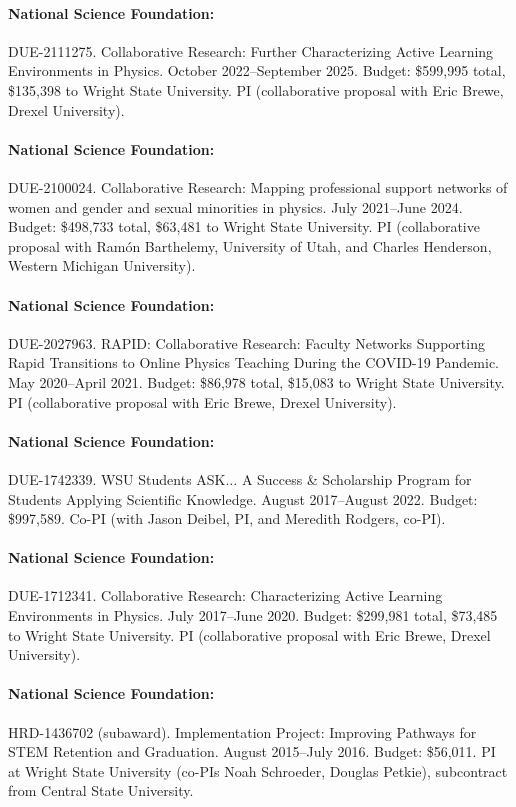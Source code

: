 \documentclass[a4paper,10pt]{article}
\begin{document}
\paragraph{National Science Foundation:} DUE-2111275. Collaborative Research: Further Characterizing Active Learning Environments in Physics. October 2022--September 2025. Budget: \$599,995
 total, \$135,398 to Wright State University. PI (collaborative proposal with Eric Brewe, Drexel University).

\paragraph{National Science Foundation:} DUE-2100024. Collaborative Research: Mapping professional support networks of women and gender and sexual minorities in physics. July 2021--June 2024. Budget: \$498,733 total, \$63,481 to Wright State University. PI (collaborative proposal with Ram\'{o}n Barthelemy, University of Utah, and Charles Henderson, Western Michigan University).

\paragraph{National Science Foundation:} DUE-2027963. RAPID: Collaborative Research: Faculty Networks Supporting Rapid Transitions to Online Physics Teaching During the COVID-19 Pandemic. May 2020--April 2021. Budget: \$86,978 total, \$15,083 to Wright State University. PI (collaborative proposal with Eric Brewe, Drexel University).

\paragraph{National Science Foundation:} DUE-1742339. WSU Students ASK$\ldots$ A Success \& Scholarship Program for Students Applying Scientific Knowledge. August 2017--August 2022. Budget: \$997,589. Co-PI (with Jason Deibel, PI, and Meredith Rodgers, co-PI).

\paragraph{National Science Foundation:} DUE-1712341. Collaborative Research: Characterizing Active Learning Environments in Physics. July 2017--June 2020. Budget: \$299,981 total, \$73,485 to Wright State University. PI (collaborative proposal with Eric Brewe, Drexel University).

\paragraph{National Science Foundation:} HRD-1436702 (subaward). Implementation Project: Improving Pathways for STEM Retention and Graduation. August 2015--July 2016. Budget: \$56,011. PI at Wright State University (co-PIs Noah Schroeder, Douglas Petkie), subcontract from Central State University.
\end{document}
